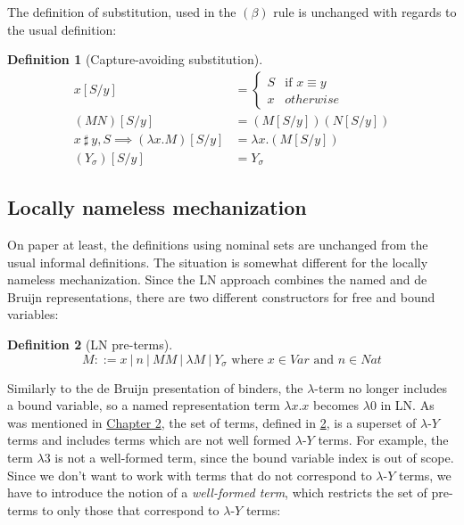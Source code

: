 \documentclass[a4paper, 12pt, twoside]{style/ociamthesis}
\theoremstyle{plain}
\theoremstyle{definition}
\newtheorem{Definition}{Definition}[chapter]
\theoremstyle{remark}
\newcommand{\lamy}{\lambda\text{-}Y}
\begin{document}
The definition of substitution, used in the \((\beta)\) rule is
unchanged with regards to the usual definition:

\begin{Definition}[Capture-avoiding substitution]

\begin{align*} 
x[S/y] &= \begin{cases}
S & \text{if }x \equiv y\\
x & otherwise
\end{cases}\\
(MN)[S/y] &= (M[S/y])(N[S/y])\\
x\ \sharp\ y , S \implies (\lambda x.M)[S/y] &= \lambda x.(M[S/y])\\
(Y_\sigma)[S/y] &= Y_\sigma
\end{align*}

\end{Definition}

\subsection{Locally nameless
mechanization}\label{locally-nameless-mechanization}

On paper at least, the definitions using nominal sets are unchanged from
the usual informal definitions. The situation is somewhat different for
the locally nameless mechanization. Since the LN approach combines the
named and de Bruijn representations, there are two different
constructors for free and bound variables:

\begin{Definition}[LN pre-terms]

\label{pterms}
\[M::= x\ |\ n\ |\ MM\ |\ \lambda M\ |\ Y_\sigma \text{ where }x \in Var \text{ and } n \in Nat\]

\end{Definition}

Similarly to the de Bruijn presentation of binders, the \(\lambda\)-term
no longer includes a bound variable, so a named representation term
\(\lambda x.x\) becomes \(\lambda 0\) in LN. As was mentioned in
\protect\hyperlink{binders}{Chapter 2}, the set of terms, defined in
\ref{pterms}, is a superset of \(\lamy\) terms and includes terms which
are not well formed \(\lamy\) terms. For example, the term \(\lambda 3\)
is not a well-formed term, since the bound variable index is out of
scope. Since we don't want to work with terms that do not correspond to
\(\lamy\) terms, we have to introduce the notion of a \emph{well-formed
term}, which restricts the set of pre-terms to only those that
correspond to \(\lamy\) terms:
\end{document}
